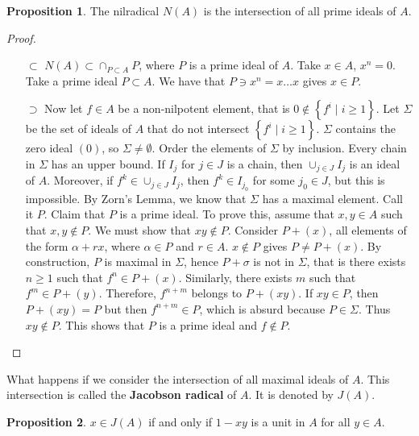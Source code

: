 \documentclass{article}
\newcommand{\rb}[1]{\left( #1 \right)}
\newcommand{\cb}[1]{\left\{ #1 \right\}}
\theoremstyle{definition}\newtheorem{definition}{Definition}[section]
\theoremstyle{definition}\newtheorem{remark}[definition]{Remark}
\theoremstyle{definition}\newtheorem*{example}{Example}
\theoremstyle{definition}\newtheorem*{note}{Note}
\newtheorem{proposition}[definition]{Proposition}
\begin{document}
\begin{proposition}
The nilradical $ N\rb{A} $ is the intersection of all prime ideals of $ A $.
\end{proposition}

\begin{proof}
\hfill
\begin{itemize}
\item[$ \subset $] $ N\rb{A} \subset \cap_{P \subset A} P $, where $ P $ is a prime ideal of $ A $. Take $ x \in A $, $ x^n = 0 $. Take a prime ideal $ P \subset A $. We have that $ P \ni x^n = x \dots x $ gives $ x \in P $.
\item[$ \supset $] Now let $ f \in A $ be a non-nilpotent element, that is $ 0 \notin \cb{f^i \mid i \ge 1} $. Let $ \Sigma $ be the set of ideals of $ A $ that do not intersect $ \cb{f^i \mid i \ge 1} $. $ \Sigma $ contains the zero ideal $ \rb{0} $, so $ \Sigma \ne \emptyset $. Order the elements of $ \Sigma $ by inclusion. Every chain in $ \Sigma $ has an upper bound. If $ I_j $ for $ j \in J $ is a chain, then $ \cup_{j \in J} I_j $ is an ideal of $ A $. Moreover, if $ f^k \in \cup_{j \in J} I_j $, then $ f^k \in I_{j_0} $ for some $ j_0 \in J $, but this is impossible. By Zorn's Lemma, we know that $ \Sigma $ has a maximal element. Call it $ P $. Claim that $ P $ is a prime ideal. To prove this, assume that $ x, y \in A $ such that $ x, y \notin P $. We must show that $ xy \notin P $. Consider $ P + \rb{x} $, all elements of the form $ \alpha + rx $, where $ \alpha \in P $ and $ r \in A $. $ x \notin P $ gives $ P \ne P + \rb{x} $. By construction, $ P $ is maximal in $ \Sigma $, hence $ P + \sigma $ is not in $ \Sigma $, that is there exists $ n \ge 1 $ such that $ f^n \in P + \rb{x} $. Similarly, there exists $ m $ such that $ f^m \in P + \rb{y} $. Therefore, $ f^{n + m} $ belongs to $ P + \rb{xy} $. If $ xy \in P $, then $ P + \rb{xy} = P $ but then $ f^{n + m} \in P $, which is absurd because $ P \in \Sigma $. Thus $ xy \notin P $. This shows that $ P $ is a prime ideal and $ f \notin P $.
\end{itemize}
\end{proof}

What happens if we consider the intersection of all maximal ideals of $ A $. This intersection is called the \textbf{Jacobson radical} of $ A $. It is denoted by $ J\rb{A} $.

\begin{proposition}
\label{prop:5.3}
$ x \in J\rb{A} $ if and only if $ 1 - xy $ is a unit in $ A $ for all $ y \in A $.
\end{proposition}
\end{document}
